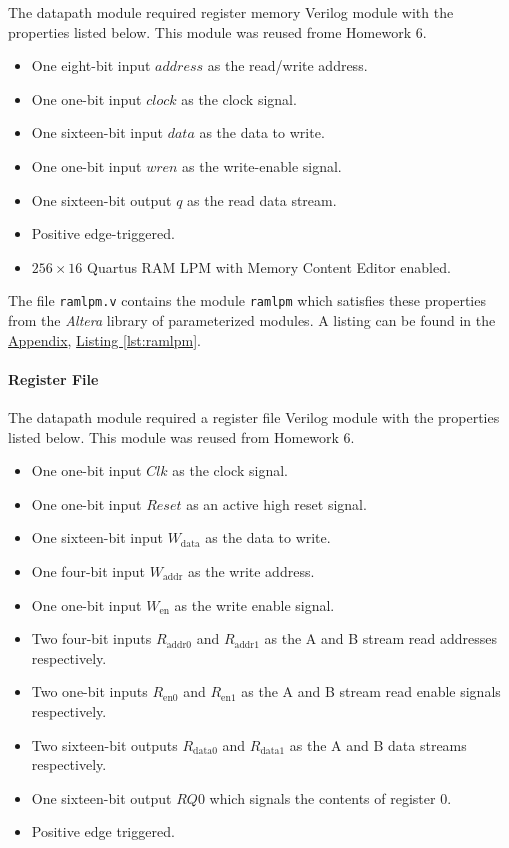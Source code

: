 The datapath module required register memory Verilog module with the properties listed below.
This module was reused frome Homework 6.

\begin{itemize}
    \item One eight-bit input $address$ as the read/write address.
    \item One one-bit input $clock$ as the clock signal.
    \item One sixteen-bit input $data$ as the data to write.
    \item One one-bit input $wren$ as the write-enable signal.
    \item One sixteen-bit output $q$ as the read data stream.
    \item Positive edge-triggered.
    \item $256 \times 16$ Quartus RAM LPM with Memory Content Editor enabled.
\end{itemize}

The file \verb|ramlpm.v| contains the module \verb|ramlpm| which satisfies these properties from the \emph{Altera} library of parameterized modules.
A listing can be found in the \hyperref[sec:appendix]{Appendix}, \hyperref[lst:ramlpm]{Listing \ref*{lst:ramlpm}}.

\paragraph{Register File} \label{par:regfile}

The datapath module required a register file Verilog module with the properties listed below.
This module was reused from Homework 6.

\begin{itemize}
    \item One one-bit input $Clk$ as the clock signal.
    \item One one-bit input $Reset$ as an active high reset signal.
    \item One sixteen-bit input $W_\text{data}$ as the data to write.
    \item One four-bit input $W_\text{addr}$ as the write address.
    \item One one-bit input $W_\text{en}$ as the write enable signal.
    \item Two four-bit inputs $R_\text{addr0}$ and $R_\text{addr1}$ as the A and B stream read addresses respectively.
    \item Two one-bit inputs $R_\text{en0}$ and $R_\text{en1}$ as the A and B stream read enable signals respectively.
    \item Two sixteen-bit outputs $R_\text{data0}$ and $R_\text{data1}$ as the A and B data streams respectively.
    \item One sixteen-bit output $RQ0$ which signals the contents of register 0.
    \item Positive edge triggered.
\end{itemize}

